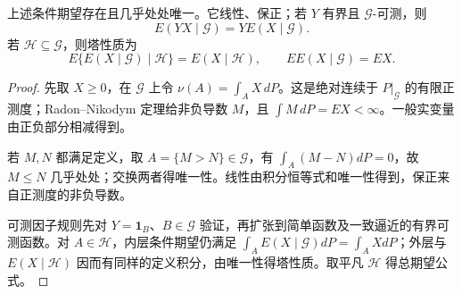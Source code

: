 \begin{theorem}
上述条件期望存在且几乎处处唯一。它线性、保正；若 $Y$ 有界且 $\mathcal G$-可测，则
\[
 E(YX\mid\mathcal G)=YE(X\mid\mathcal G).
\]
若 $\mathcal H\subseteq\mathcal G$，则塔性质为
\[
 E\{E(X\mid\mathcal G)\mid\mathcal H\}=E(X\mid\mathcal H),
 \qquad E E(X\mid\mathcal G)=EX.
\]
\end{theorem}
\begin{proof}
先取 $X\ge0$，在 $\mathcal G$ 上令 $\nu(A)=\int_AX\,dP$。这是绝对连续于 $P|_{\mathcal G}$ 的有限正测度；Radon--Nikodym 定理给非负导数 $M$，且 $\int M\,dP=EX<\infty$。一般实变量由正负部分相减得到。

若 $M,N$ 都满足定义，取 $A=\{M>N\}\in\mathcal G$，有 $\int_A(M-N)dP=0$，故 $M\le N$ 几乎处处；交换两者得唯一性。线性由积分恒等式和唯一性得到，保正来自正测度的非负导数。

可测因子规则先对 $Y=\mathbf1_B$、$B\in\mathcal G$ 验证，再扩张到简单函数及一致逼近的有界可测函数。对 $A\in\mathcal H$，内层条件期望仍满足 $\int_AE(X\mid\mathcal G)dP=\int_AXdP$；外层与 $E(X\mid\mathcal H)$ 因而有同样的定义积分，由唯一性得塔性质。取平凡 $\mathcal H$ 得总期望公式。
\end{proof}

